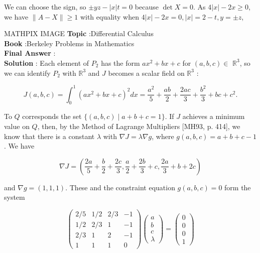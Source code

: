 \documentclass[10pt]{article}
\begin{document}
We can choose the sign, so $\pm y z-|x| t=0$ because $\operatorname{det} X=0$. As $4|x|-2 x \geqslant 0$, we have $\|A-X\| \geqslant 1$ with equality when $4|x|-2 x=0,|x|=2-t, y=\pm z$,

MATHPIX IMAGE
\textbf{Topic} :Differential Calculus \\
\textbf{Book} :Berkeley Problems in Mathematics\\
\textbf{Final Answer} :\\


\textbf{Solution} : Each element of $P_{2}$ has the form $a x^{2}+b x+c$ for $(a, b, c) \in$ $\mathbb{R}^{3}$, so we can identify $P_{2}$ with $\mathbb{R}^{3}$ and $J$ becomes a scalar field on $\mathbb{R}^{3}$ :

$$
J(a, b, c)=\int_{0}^{1}\left(a x^{2}+b x+c\right)^{2} d x=\frac{a^{2}}{5}+\frac{a b}{2}+\frac{2 a c}{3}+\frac{b^{2}}{3}+b c+c^{2} .
$$

To $Q$ corresponds the set $\{(a, b, c) \mid a+b+c=1\}$. If $J$ achieves a minimum value on $Q$, then, by the Method of Lagrange Multipliers [MH93, p. 414], we know that there is a constant $\lambda$ with $\nabla J=\lambda \nabla g$, where $g(a, b, c)=a+b+c-1$. We have

$$
\nabla J=\left(\frac{2 a}{5}+\frac{b}{2}+\frac{2 c}{3}, \frac{a}{2}+\frac{2 b}{3}+c, \frac{2 a}{3}+b+2 c\right)
$$

and $\nabla g=(1,1,1)$. These and the constraint equation $g(a, b, c)=0$ form the system

$$
\left(\begin{array}{cccc}
2 / 5 & 1 / 2 & 2 / 3 & -1 \\
1 / 2 & 2 / 3 & 1 & -1 \\
2 / 3 & 1 & 2 & -1 \\
1 & 1 & 1 & 0
\end{array}\right)\left(\begin{array}{l}
a \\
b \\
c \\
\lambda
\end{array}\right)=\left(\begin{array}{c}
0 \\
0 \\
0 \\
1
\end{array}\right)
$$
\end{document}

